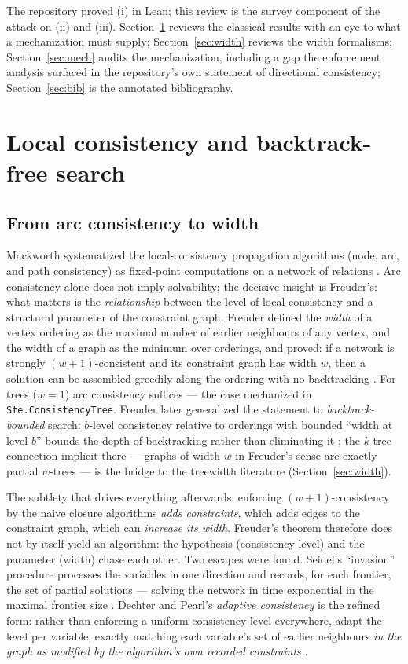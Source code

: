 \documentclass[11pt]{article}
\newcommand{\ste}[1]{\texttt{#1}}
\begin{document}
The repository proved (i) in Lean; this review is the survey component
of the attack on (ii) and (iii). Section~\ref{sec:classical} reviews
the classical results with an eye to what a mechanization must supply;
Section~\ref{sec:width} reviews the width formalisms;
Section~\ref{sec:mech} audits the mechanization, including a gap the
enforcement analysis surfaced in the repository's own statement of
directional consistency; Section~\ref{sec:bib} is the annotated
bibliography.

\section{Local consistency and backtrack-free search}
\label{sec:classical}

\subsection{From arc consistency to width}

Mackworth systematized the local-consistency propagation algorithms
(node, arc, and path consistency) as fixed-point computations on a
network of relations \citep{mackworth1977consistency}. Arc consistency
alone does not imply solvability; the decisive insight is Freuder's:
what matters is the \emph{relationship} between the level of local
consistency and a structural parameter of the constraint graph.
Freuder defined the \emph{width} of a vertex ordering as the maximal
number of earlier neighbours of any vertex, and the width of a graph
as the minimum over orderings, and proved: if a network is strongly
$(w{+}1)$-consistent and its constraint graph has width $w$, then a
solution can be assembled greedily along the ordering with no
backtracking \citep{freuder1982backtrack}. For trees ($w=1$) arc
consistency suffices --- the case mechanized in
\ste{Ste.ConsistencyTree}. Freuder later generalized the statement to
\emph{backtrack-bounded} search: $b$-level consistency relative to
orderings with bounded ``width at level $b$'' bounds the depth of
backtracking rather than eliminating it
\citep{freuder1985backtrackBounded}; the $k$-tree connection implicit
there --- graphs of width $w$ in Freuder's sense are exactly partial
$w$-trees --- is the bridge to the treewidth literature
(Section~\ref{sec:width}).

The subtlety that drives everything afterwards: enforcing
$(w{+}1)$-consistency by the naive closure algorithms \emph{adds
constraints}, which adds edges to the constraint graph, which can
\emph{increase its width}. Freuder's theorem therefore does not by
itself yield an algorithm: the hypothesis (consistency level) and the
parameter (width) chase each other. Two escapes were found. Seidel's
``invasion'' procedure processes the variables in one direction and
records, for each frontier, the set of partial solutions --- solving
the network in time exponential in the maximal frontier size
\citep{seidel1981invasion}. Dechter and Pearl's \emph{adaptive
consistency} is the refined form: rather than enforcing a uniform
consistency level everywhere, adapt the level per variable, exactly
matching each variable's set of earlier neighbours \emph{in the graph
as modified by the algorithm's own recorded constraints}
\citep{dechterpearl1987network}.
\end{document}
